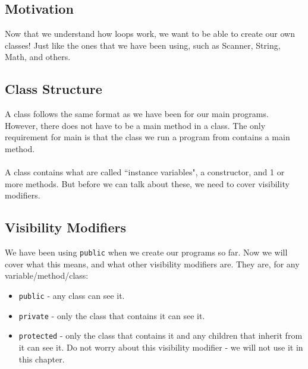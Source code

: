 
\subsection{Motivation}
Now that we understand how loops work, we want to be able to create our own classes! Just like the ones that we have been using, such as Scanner, String, Math, and others. 

\subsection{Class Structure}
A class follows the same format as we have been for our main programs. However, there does not have to be a main method in a class. The only requirement for main is that the class we run a program from contains a main method.
\\ \\
A class contains what are called ``instance variables", a constructor, and 1 or more methods. But before we can talk about these, we need to cover visibility modifiers.

\subsection{Visibility Modifiers}
We have been using \verb|public| when we create our programs so far. Now we will cover what this means, and what other visibility modifiers are. They are, for any variable/method/class:
\begin{itemize}
\item \verb|public| - any class can see it.
\item \verb|private| - only the class that contains it can see it.
\item \verb|protected| - only the class that contains it and any children that inherit from it can see it. Do not worry about this visibility modifier - we will not use it in this chapter.
\end{itemize}

